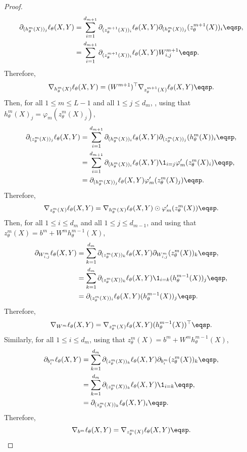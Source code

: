 \begin{proof}
\begin{align*}
\partial_{(h_{\theta}^m(X))_j}\ell_{\theta}(X,Y) &=  \sum_{i=1}^{d_{m+1}} \partial_{(z_{\theta}^{m+1}(X))_i}\ell_{\theta}(X,Y)\partial_{(h_{\theta}^m(X))_j}(z_{\theta}^{m+1}(X))_i\eqsp,\\
&=  \sum_{i=1}^{d_{m+1}} \partial_{(z_{\theta}^{m+1}(X))_i}\ell_{\theta}(X,Y)W^{m+1}_{i,j}\eqsp.
\end{align*}
Therefore,
$$
\nabla_{h_{\theta}^m(X)} \ell_{\theta}(X,Y) = (W^{m+1})^\top\nabla_{z_{\theta}^{m+1}(X)} \ell_{\theta}(X,Y) \eqsp.
$$
Then, for all $1\leqslant m \leqslant L-1$ and all $1\leqslant j \leqslant d_m$, ,  using that $h_{\theta}^{m}(X)_j =\varphi_m(z_{\theta}^{m}(X)_j)$,
\begin{align*}
\partial_{(z_{\theta}^m(X))_j}\ell_{\theta}(X,Y) &=  \sum_{i=1}^{d_{m+1}} \partial_{(h_{\theta}^m(X))_i}\ell_{\theta}(X,Y)\partial_{(z_{\theta}^m(X))_j}(h_{\theta}^m(X))_i\eqsp,\\
&=  \sum_{i=1}^{d_{m+1}} \partial_{(h_{\theta}^m(X))_i}\ell_{\theta}(X,Y) \1_{i=j}\varphi_m'(z_{\theta}^{m}(X)_i)\eqsp,\\
&= \partial_{(h_{\theta}^m(X))_j}\ell_{\theta}(X,Y) \varphi_m'(z_{\theta}^{m}(X)_j)\eqsp.
\end{align*}
Therefore,
$$
\nabla_{z_{\theta}^m(X)} \ell_{\theta}(X,Y) = \nabla_{h_{\theta}^m(X)}\ell_{\theta}(X,Y) \odot \varphi_m'(z_{\theta}^{m}(X))\eqsp.
$$
Then, for all $1\leqslant i\leqslant d_m$ and all $1\leqslant j \leqslant d_{m-1}$, and using that $z_{\theta}^m(X) = b^m + W^mh_{\theta}^{m-1}(X)$,
\begin{align*}
\partial_{W^m_{i,j}}\ell_{\theta}(X,Y) &=  \sum_{k=1}^{d_m} \partial_{(z_{\theta}^m(X))_k}\ell_{\theta}(X,Y)\partial_{W^m_{i,j}}(z_{\theta}^m(X))_k\eqsp,\\
&=  \sum_{k=1}^{d_m} \partial_{(z_{\theta}^m(X))_k}\ell_{\theta}(X,Y)\1_{i=k}(h_{\theta}^{m-1}(X))_j\eqsp,\\
&=  \partial_{(z_{\theta}^m(X))_i}\ell_{\theta}(X,Y)(h_{\theta}^{m-1}(X))_j\eqsp.
\end{align*}
Therefore,
$$
\nabla_{W^m} \ell_{\theta}(X,Y) = \nabla_{z_{\theta}^m(X)}\ell_{\theta}(X,Y)(h_{\theta}^{m-1}(X))^\top\eqsp.
$$
Similarly, for all $1\leqslant i\leqslant d_m$,  using that $z_{\theta}^m(X) = b^m + W^mh_{\theta}^{m-1}(X)$,
\begin{align*}
\partial_{b^m_{i}}\ell_{\theta}(X,Y) &=  \sum_{k=1}^{d_m} \partial_{(z_{\theta}^m(X))_k}\ell_{\theta}(X,Y)\partial_{b^m_{i}}(z_{\theta}^m(X))_k\eqsp,\\
&=  \sum_{k=1}^{d_m} \partial_{(z_{\theta}^m(X))_k}\ell_{\theta}(X,Y)\1_{i=k}\eqsp,\\
&=  \partial_{(z_{\theta}^m(X))_k}\ell_{\theta}(X,Y)_i\eqsp.
\end{align*}
Therefore,
$$
\nabla_{b^m} \ell_{\theta}(X,Y) =  \nabla_{z_{\theta}^m(X)}\ell_{\theta}(X,Y)\eqsp.
$$
\end{proof}
